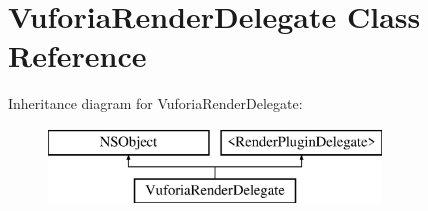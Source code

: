 \hypertarget{interface_vuforia_render_delegate}{}\section{Vuforia\+Render\+Delegate Class Reference}
\label{interface_vuforia_render_delegate}
Inheritance diagram for Vuforia\+Render\+Delegate\+:\begin{figure}[H]
\begin{center}
\leavevmode
\includegraphics[height=2.000000cm]{interface_vuforia_render_delegate}
\end{center}
\end{figure}
